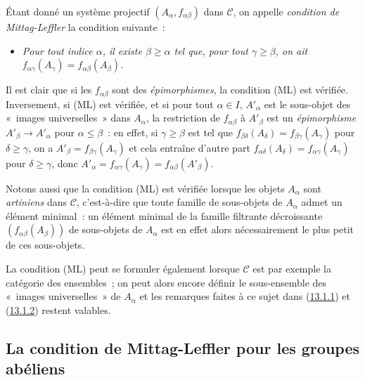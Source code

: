 \begin{env}[13.1.2]
\label{0.13.1.2-fr}
Étant donné un système projectif $(A_\alpha,f_{\alpha\beta})$ dans
$\mathcal C$, on appelle \emph{condition de Mittag-Leffler} la condition
suivante~:
\begin{itemize}
\item[\textbf{(ML)}]
\emph{Pour tout indice $\alpha$, il existe $\beta\geq\alpha$ tel que, pour
tout $\gamma\geq\beta$, on ait
$f_{\alpha\gamma}(A_\gamma)=f_{\alpha\beta}(A_\beta)$.}
\end{itemize}
Il est clair que si les $f_{\alpha\beta}$ sont des \emph{épimorphismes}, la
condition (ML) est vérifiée. Inversement, si (ML) est vérifiée, et si pour
tout $\alpha\in I$, $A'_\alpha$ est le sous-objet des «~images
universelles~» dans $A_\alpha$, la restriction de $f_{\alpha\beta}$ à
$A'_\beta$ est un \emph{épimorphisme}
$A'_\beta\to A'_\alpha$ pour $\alpha\leq\beta$~: en effet, si
$\gamma\geq\beta$ est tel que
$f_{\beta\delta}(A_\delta)=f_{\beta\gamma}(A_\gamma)$ pour
$\delta\geq\gamma$, on a
$A'_\beta=f_{\beta\gamma}(A_\gamma)$ et cela entraîne d'autre part
$f_{\alpha\delta}(A_\delta)=f_{\alpha\gamma}(A_\gamma)$ pour
$\delta\geq\gamma$, donc
$A'_\alpha=f_{\alpha\gamma}(A_\gamma)=f_{\alpha\beta}(A'_\beta)$.

Notons aussi que la condition (ML) est vérifiée lorsque les objets
$A_\alpha$ sont \emph{artiniens} dans $\mathcal C$, c'est-à-dire que toute
famille de sous-objets de $A_\alpha$ admet un élément minimal~: un élément
minimal de la famille filtrante décroissante
$(f_{\alpha\beta}(A_\beta))$ de sous-objets de $A_\alpha$ est en effet
alors nécessairement le plus petit de ces sous-objets.
\end{env}

\begin{remark}[13.1.3]
\label{0.13.1.3-fr}
La condition (ML) peut se formuler également lorsque $\mathcal C$ est par
exemple la catégorie des ensembles~; on peut alors encore définir le
sous-ensemble des «~images universelles~» de $A_\alpha$ et les remarques
faites à ce sujet dans (\hyperref[0.13.1.1-fr]{13.1.1}) et
(\hyperref[0.13.1.2-fr]{13.1.2}) restent valables.
\end{remark}

\subsection{La condition de Mittag-Leffler pour les groupes abéliens}
\label{subsection:0.13.2-fr}

